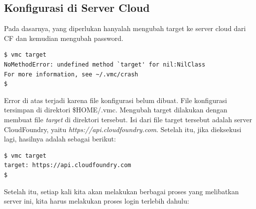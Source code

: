 \subsection{Konfigurasi di Server Cloud}

Pada dasarnya, yang diperlukan hanyalah mengubah target ke server cloud dari CF dan kemudian mengubah password.

\lstset{language=bash,caption=Mengubah target server - belum ada konfigurasi}
\begin{lstlisting}
$ vmc target 
NoMethodError: undefined method `target' for nil:NilClass
For more information, see ~/.vmc/crash
$
\end{lstlisting}

Error di atas terjadi karena file konfigurasi belum dibuat. File konfigurasi tersimpan di direktori \$HOME/.vmc. Mengubah target dilakukan dengan membuat file \textit{target} di direktori tersebut. Isi dari file target tersebut adalah server CloudFoundry, yaitu \textit{https://api.cloudfoundry.com}. Setelah itu, jika dieksekusi lagi, hasilnya adalah sebagai berikut:

\lstset{language=bash,caption=Mengubah target server - setelah konfigurasi}
\begin{lstlisting}
$ vmc target 
target: https://api.cloudfoundry.com
$ 
\end{lstlisting}

Setelah itu, setiap kali kita akan melakukan berbagai proses yang melibatkan server ini, kita harus melakukan proses login terlebih dahulu:

